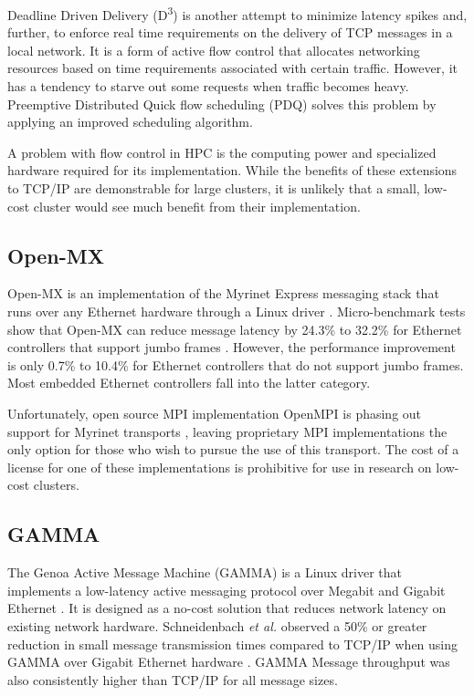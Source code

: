 \documentclass[11pt]{book}
\begin{document}
Deadline Driven Delivery (D\textsuperscript{3}) \cite{wilson-11} is another attempt to
minimize latency spikes and, further, to enforce real time requirements on the delivery of
TCP messages in a local network.  It is a form of active flow control that allocates
networking resources based on time requirements associated with certain traffic.  However,
it has a tendency to starve out some requests when traffic becomes heavy.  Preemptive
Distributed Quick flow scheduling (PDQ) \cite{hong-12} solves this problem by applying an
improved scheduling algorithm.

A problem with flow control in HPC is the computing power and specialized hardware
required for its implementation.  While the benefits of these extensions to TCP/IP are
demonstrable for large clusters, it is unlikely that a small, low-cost cluster would see
much benefit from their implementation.

\subsection{Open-MX}

Open-MX is an implementation of the Myrinet Express messaging stack that runs over any
Ethernet hardware through a Linux driver \cite{goglin-08}.  Micro-benchmark tests show
that Open-MX can reduce message latency by 24.3\% to 32.2\% for Ethernet controllers that
support jumbo frames \cite{goglin-11}.  However, the performance improvement is only 0.7\%
to 10.4\% for Ethernet controllers that do not support jumbo frames.  Most embedded
Ethernet controllers fall into the latter category.

Unfortunately, open source MPI implementation OpenMPI is phasing out support for Myrinet
transports \cite{openmpi-myrinet}, leaving proprietary MPI implementations the only option
for those who wish to pursue the use of this transport.  The cost of a license for one of
these implementations is prohibitive for use in research on low-cost clusters.

\subsection{GAMMA}

The Genoa Active Message Machine (GAMMA) is a Linux driver that implements a low-latency
active messaging protocol over Megabit and Gigabit Ethernet \cite{gamma}.  It is designed
as a no-cost solution that reduces network latency on existing network hardware.
Schneidenbach \emph{et al.} observed a 50\% or greater reduction in small message
transmission times compared to TCP/IP when using GAMMA over Gigabit Ethernet hardware
\cite{schneidenbach-03}.  GAMMA Message throughput was also consistently higher than
TCP/IP for all message sizes.
\end{document}
